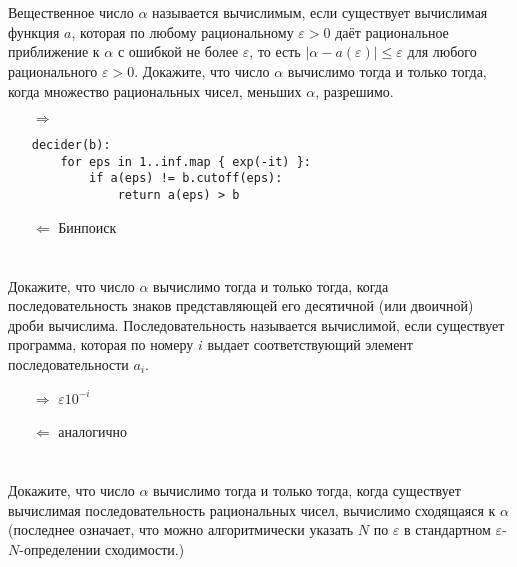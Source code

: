 



\setcounter{section}{184}

\section{}
Вещественное число $\alpha$ называется вычислимым, если существует вычислимая функция $a$, которая по любому рациональному $\varepsilon > 0$ даёт рациональное приближение к $\alpha$ с ошибкой не более $\varepsilon$, то есть $|\alpha − a(\varepsilon)| \le \varepsilon$ для любого рационального $\varepsilon > 0$. Докажите, что число $\alpha$ вычислимо тогда и только тогда, когда множество рациональных чисел, меньших $\alpha$, разрешимо.

\begin{itemize}
    \item [\(\Rightarrow\)]
          \begin{verbatim}
decider(b):
    for eps in 1..inf.map { exp(-it) }:
        if a(eps) != b.cutoff(eps):
            return a(eps) > b
          \end{verbatim}
    \item [\(\Leftarrow\)] Бинпоиск
\end{itemize}

\section{}
Докажите, что число $\alpha$ вычислимо тогда и только тогда, когда последовательность знаков представляющей его десятичной (или двоичной) дроби вычислима. Последовательность называется вычислимой, если существует программа, которая по номеру $i$ выдает соответствующий элемент последовательности $a_i$.

\begin{itemize}
    \item [\( \Rightarrow \)] \(\varepsilon 10^{ - i}\)
    \item [\( \Leftarrow \)] аналогично
\end{itemize}

\section{}
Докажите, что число $\alpha$ вычислимо тогда и только тогда, когда существует вычислимая последовательность рациональных чисел, вычислимо сходящаяся к $\alpha$ (последнее означает, что можно алгоритмически указать $N$ по $\varepsilon$ в стандартном $\varepsilon$-$N$-определении сходимости.)

